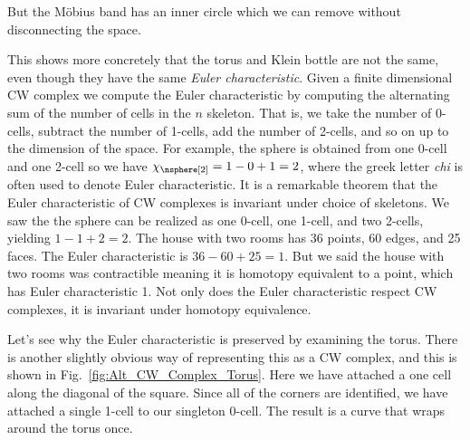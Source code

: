     But the M\"{o}bius band has an inner circle which we can remove
    without disconnecting the space.
    \par\hfill\par
    This shows more concretely that the torus and Klein bottle are not
    the same, even though they have the same
    \textit{Euler characteristic}. Given a finite dimensional CW complex
    we compute the Euler characteristic by computing the alternating sum
    of the number of cells in the $n$ skeleton. That is, we take the
    number of 0-cells, subtract the number of 1-cells, add the number of
    2-cells, and so on up to the dimension of the space. For example,
    the sphere is obtained from one 0-cell and one 2-cell so we have
    $\chi_{\nsphere[2]}=1-0+1=2$, where the greek letter \textit{chi} is
    often used to denote Euler characteristic. It is a remarkable
    theorem that the Euler characteristic of CW complexes is invariant
    under choice of skeletons. We saw the the sphere can be realized as
    one 0-cell, one 1-cell, and two 2-cells, yielding $1-1+2=2$. The
    house with two rooms has 36 points, 60 edges, and 25 faces. The
    Euler characteristic is $36-60+25=1$. But we said the house with
    two rooms was contractible meaning it is homotopy equivalent to a
    point, which has Euler characteristic 1. Not only does the Euler
    characteristic respect CW complexes, it is invariant under homotopy
    equivalence.
    \par\hfill\par
    \begin{minipage}[t]{0.64\textwidth}
        Let's see why the Euler characteristic is preserved by
        examining the torus. There is another slightly obvious way of
        representing this as a CW complex, and this is shown in
        Fig.~\ref{fig:Alt_CW_Complex_Torus}. Here we have attached
        a one cell along the diagonal of the square. Since all of the
        corners are identified, we have attached a single 1-cell to our
        singleton 0-cell. The result is a curve that wraps around the
        torus once.
    \end{minipage}
    \hfill
